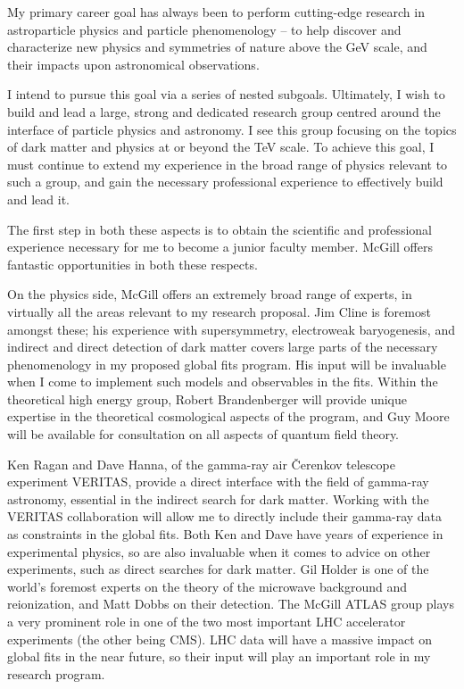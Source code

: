 \documentclass[10pt,oneside,twocolumn,a4paper]{article}
\author{Pat Scott}
\date{}
\begin{document}
My primary career goal has always been to perform cutting-edge research in astroparticle physics and particle phenomenology -- to help discover and characterize new physics and symmetries of nature above the GeV scale, and their impacts upon astronomical observations.

I intend to pursue this goal via a series of nested subgoals.  Ultimately, I wish to build and lead a large, strong and dedicated research group centred around the interface of particle physics and astronomy.  I see this group focusing on the topics of dark matter and physics at or beyond the TeV scale.  To achieve this goal, I must continue to extend my experience in the broad range of physics relevant to such a group, and gain the necessary professional experience to effectively build and lead it.  

The first step in both these aspects is to obtain the scientific and professional experience necessary for me to become a junior faculty member.  McGill offers fantastic opportunities in both these respects.

On the physics side, McGill offers an extremely broad range of experts, in virtually all the areas relevant to my research proposal.  Jim Cline is foremost amongst these; his experience with supersymmetry, electroweak baryogenesis, and indirect and direct detection of dark matter covers large parts of the necessary phenomenology in my proposed global fits program.  His input will be invaluable when I come to implement such models and observables in the fits.  Within the theoretical high energy group, Robert Brandenberger will provide unique expertise in the theoretical cosmological aspects of the program, and Guy Moore will be available for consultation on all aspects of quantum field theory.

Ken Ragan and Dave Hanna, of the gamma-ray air \v{C}erenkov telescope experiment VERITAS, provide a direct interface with the field of gamma-ray astronomy, essential in the indirect search for dark matter.  Working with the VERITAS collaboration will allow me to directly include their gamma-ray data as constraints in the global fits.  Both Ken and Dave have years of experience in experimental physics, so are also invaluable when it comes to advice on other experiments, such as direct searches for dark matter.  Gil Holder is one of the world's foremost experts on the theory of the microwave background and reionization, and Matt Dobbs on their detection.  The McGill ATLAS group plays a very prominent role in one of the two most important LHC accelerator experiments (the other being CMS).  LHC data will have a massive impact on global fits in the near future, so their input will play an important role in my research program.
\end{document}
